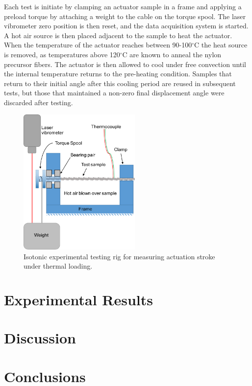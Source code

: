 \documentclass[twocolumn,10pt]{asme2e}
\begin{document}
Each test is initiate by clamping an actuator sample in a frame and applying a preload torque by attaching a weight to the cable on the torque spool. The laser vibrometer zero position is then reset, and the data acquisition system is started. A hot air source is then placed adjacent to the sample to heat the actuator. When the temperature of the actuator reaches between 90-100$^\circ$C the heat source is removed, as temperatures above 120$^\circ$C are known to anneal the nylon precursor fibers. The actuator is then allowed to cool under free convection until the internal temperature returns to the pre-heating condition. Samples that return to their initial angle after this cooling period are reused in subsequent tests, but those that maintained a non-zero final displacement angle were discarded after testing. 



\begin{figure}
    \centering
        \includegraphics[width=6cm]{../Images/experimental_setup.pdf}
        \caption{Isotonic experimental testing rig for measuring actuation stroke under thermal loading.}
        \label{fig:setup}
\end{figure}

\section{Experimental Results}


\section{Discussion}

\section{Conclusions}







\end{document}

